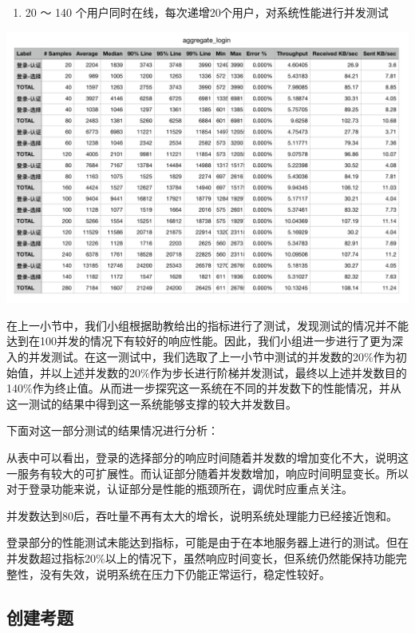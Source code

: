 \documentclass[hyperref, a4paper]{ctexart}
\providecommand{\tightlist}{%
  \setlength{\itemsep}{0pt}\setlength{\parskip}{0pt}}
\begin{document}
\begin{enumerate}
\def\labelenumi{\arabic{enumi}.}
\setcounter{enumi}{1}
\tightlist
\item
  20 ～ 140 个用户同时在线，每次递增20个用户，对系统性能进行并发测试
\end{enumerate}

\includegraphics{resources/wcn/login_aggregate.png}

在上一小节中，我们小组根据助教给出的指标进行了测试，发现测试的情况并不能达到在100并发的情况下有较好的响应性能。因此，我们小组进一步进行了更为深入的并发测试。在这一测试中，我们选取了上一小节中测试的并发数的20\%作为初始值，并以上述并发数的20\%作为步长进行阶梯并发测试，最终以上述并发数目的140\%作为终止值。从而进一步探究这一系统在不同的并发数下的性能情况，并从这一测试的结果中得到这一系统能够支撑的较大并发数目。

下面对这一部分测试的结果情况进行分析：

从表中可以看出，登录的选择部分的响应时间随着并发数的增加变化不大，说明这一服务有较大的可扩展性。而认证部分随着并发数增加，响应时间明显变长。所以对于登录功能来说，认证部分是性能的瓶颈所在，调优时应重点关注。

并发数达到80后，吞吐量不再有太大的增长，说明系统处理能力已经接近饱和。

登录部分的性能测试未能达到指标，可能是由于在本地服务器上进行的测试。但在并发数超过指标20\%以上的情况下，虽然响应时间变长，但系统仍然能保持功能完整性，没有失效，说明系统在压力下仍能正常运行，稳定性较好。

\hypertarget{ux521bux5efaux8003ux9898}{%
\subsection{创建考题}\label{ux521bux5efaux8003ux9898}}
\end{document}
